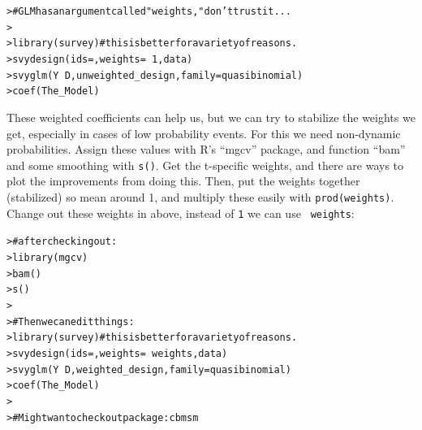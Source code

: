 \documentclass[12pt]{article}\usepackage[]{graphicx}\usepackage[]{color}
\makeatletter
\newcommand{\hlnum}[1]{\textcolor[rgb]{0.82,0.78,0.62}{#1}}%
\newcommand{\hlcom}[1]{\textcolor[rgb]{0.404,0.408,0.42}{#1}}%
\newcommand{\hlopt}[1]{\textcolor[rgb]{0.882,0.878,0.898}{#1}}%
\newcommand{\hlstd}[1]{\textcolor[rgb]{0.882,0.878,0.898}{#1}}%
\newcommand{\hlkwc}[1]{\textcolor[rgb]{0.812,0.522,0.388}{#1}}%
\newcommand{\hlkwd}[1]{\textcolor[rgb]{0.733,0.388,0.812}{#1}}%
\newenvironment{kframe}{%
 \def\at@end@of@kframe{}%
 \ifinner\ifhmode%
  \def\at@end@of@kframe{\end{minipage}}%
  \begin{minipage}{\columnwidth}%
 \fi\fi%
 \def\FrameCommand##1{\hskip\@totalleftmargin \hskip-\fboxsep
 \colorbox{shadecolor}{##1}\hskip-\fboxsep
     \hskip-\linewidth \hskip-\@totalleftmargin \hskip\columnwidth}%
 \MakeFramed {\advance\hsize-\width
   \@totalleftmargin\z@ \linewidth\hsize
   \@setminipage}}%
 {\par\unskip\endMakeFramed%
 \at@end@of@kframe}
\newenvironment{knitrout}{}{} %
\makeatother
\begin{document}
\begin{flushleft}
\begin{knitrout}
\color{fgcolor}\begin{kframe}
\begin{alltt}
\hlstd{> }\hlcom{# GLM has an argument called "weights," don't trust it...}
\hlstd{> }
\hlstd{> }\hlkwd{library}\hlstd{(survey)} \hlcom{# this is better for a variety of reasons.}
\hlstd{> }     \hlkwd{svydesign}\hlstd{(}\hlkwc{ids} \hlstd{= ,} \hlkwc{weights} \hlstd{=} \hlopt{~}\hlnum{1}\hlstd{, data)}
\hlstd{> }     \hlkwd{svyglm}\hlstd{( Y} \hlopt{~} \hlstd{D, unweighted_design,} \hlkwc{family} \hlstd{= quasibinomial)}
\hlstd{> }     \hlkwd{coef}\hlstd{(The_Model)}
\end{alltt}
\end{kframe}
\end{knitrout}

These weighted coefficients can help us, but we can try to stabilize the weights we get, especially in cases of low probability events. For this we need non-dynamic probabilities. Assign these values with R's ``mgcv'' package, and function ``bam'' and some smoothing with \texttt{s()}. Get the t-specific weights, and there are ways to plot the improvements  from doing this. Then, put the weights together (stabilized) so mean around 1, and multiply these easily with \texttt{prod(weights)}. Change out these weights in above, instead of \texttt{1} we can use \texttt{ weights}:

\begin{knitrout}
\color{fgcolor}\begin{kframe}
\begin{alltt}
\hlstd{> }\hlcom{# after checking out:}
\hlstd{> }\hlkwd{library}\hlstd{(mgcv)}
\hlstd{> }     \hlkwd{bam}\hlstd{()}
\hlstd{> }     \hlkwd{s}\hlstd{()}
\hlstd{> }
\hlstd{> }\hlcom{# Then we can edit things:}
\hlstd{> }\hlkwd{library}\hlstd{(survey)} \hlcom{# this is better for a variety of reasons.}
\hlstd{> }     \hlkwd{svydesign}\hlstd{(}\hlkwc{ids} \hlstd{= ,} \hlkwc{weights} \hlstd{=} \hlopt{~}\hlstd{weights, data)}
\hlstd{> }     \hlkwd{svyglm}\hlstd{( Y} \hlopt{~} \hlstd{D, weighted_design,} \hlkwc{family} \hlstd{= quasibinomial)}
\hlstd{> }     \hlkwd{coef}\hlstd{(The_Model)}
\hlstd{> }
\hlstd{> }     \hlcom{# Might wan to check out package: cbmsm}
\end{alltt}
\end{kframe}
\end{knitrout}


\end{flushleft}
\end{document}
